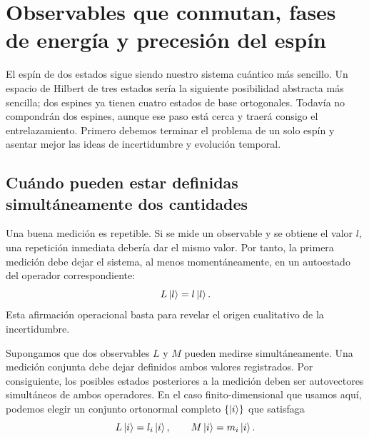 \chapter{Observables que conmutan, fases de energía y precesión del espín}


El espín de dos estados sigue siendo nuestro sistema cuántico más sencillo. Un espacio de Hilbert de tres estados sería la siguiente posibilidad abstracta más sencilla; dos espines ya tienen cuatro estados de base ortogonales. Todavía no compondrán dos espines, aunque ese paso está cerca y traerá consigo el entrelazamiento. Primero debemos terminar el problema de un solo espín y asentar mejor las ideas de incertidumbre y evolución temporal.

\section{Cuándo pueden estar definidas simultáneamente dos cantidades}

Una buena medición es repetible. Si se mide un observable y se obtiene el valor \(l\), una repetición inmediata debería dar el mismo valor. Por tanto, la primera medición debe dejar el sistema, al menos momentáneamente, en un autoestado del operador correspondiente:
\begin{equation}
L\left\lvert l\right\rangle=l\left\lvert l\right\rangle.
\end{equation}
Esta afirmación operacional basta para revelar el origen cualitativo de la incertidumbre.

Supongamos que dos observables \(L\) y \(M\) pueden medirse simultáneamente. Una medición conjunta debe dejar definidos ambos valores registrados. Por consiguiente, los posibles estados posteriores a la medición deben ser autovectores simultáneos de ambos operadores. En el caso finito-dimensional que usamos aquí, podemos elegir un conjunto ortonormal completo \(\{\left\lvert i\right\rangle\}\) que satisfaga
\begin{equation}
L\left\lvert i\right\rangle=l_i\left\lvert i\right\rangle,
\qquad
M\left\lvert i\right\rangle=m_i\left\lvert i\right\rangle.
\label{eq:l5-common-eigenvectors}
\end{equation}

